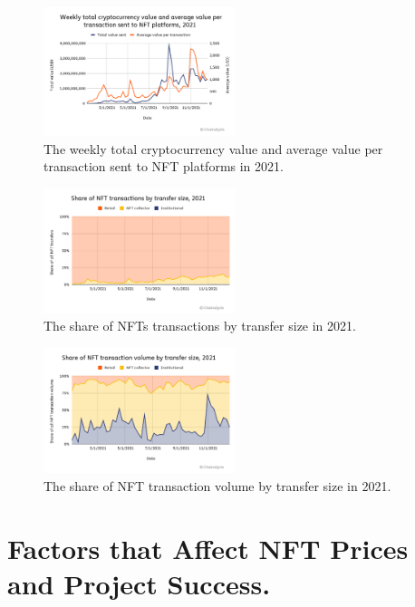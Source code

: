 \begin{figure}[htbp]
\includegraphics[width=0.5\textwidth]{Figure/The weekly total cryptocurrency value.png}
\caption{The weekly total cryptocurrency value and average value per transaction sent to NFT platforms in 2021.~\cite{tumblr_team_2022}}
\label{fig:week}
\end{figure}

\begin{figure}[htbp]
\includegraphics[width=0.5\textwidth]{Figure/transactions.png}
\caption{The share of NFTs transactions by transfer size in 2021.~\cite{tumblr_team_2022}}
\label{fig:transactions}
\end{figure}

\begin{figure}[htbp]
\includegraphics[width=0.5\textwidth]{Figure/transactions volume.png}
\caption{The share of NFT transaction volume by transfer size in 2021.~\cite{tumblr_team_2022}}
\label{fig:transactions volume}
\end{figure}

\section{Factors that Affect NFT Prices and Project Success.}

